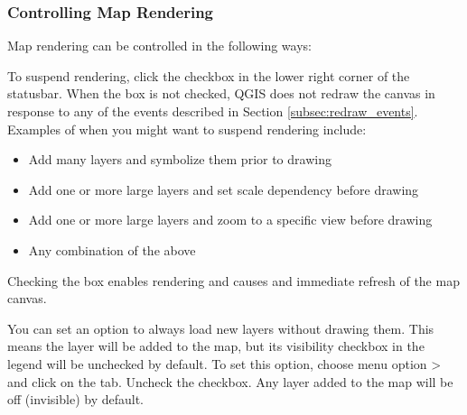 \subsubsection{Controlling Map Rendering}\label{label_controlmap}

Map rendering can be controlled in the following ways:

\label{label_suspendrender}

To suspend rendering, click the  checkbox in the lower right
corner of the statusbar. When the  box is not checked, QGIS
does not redraw the canvas in response to any of the events described in
Section \ref{subsec:redraw_events}. Examples of when you might want to suspend
rendering include:

\begin{itemize}
\item Add many layers and symbolize them prior to drawing
\item Add one or more large layers and set scale dependency before drawing
\item Add one or more large layers and zoom to a specific view before drawing
\item Any combination of the above
\end{itemize}

Checking the  box enables rendering and causes and immediate
refresh of the map canvas.

\label{label_settinglayer}

You can set an option to always load new layers without drawing them. This
means the layer will be added to the map, but its visibility checkbox in the
legend will be unchecked by default. To set this option, choose
menu option  >  and click on the
 tab. Uncheck the  checkbox. Any layer added to the map will be off (invisible) by
default.

%
%

